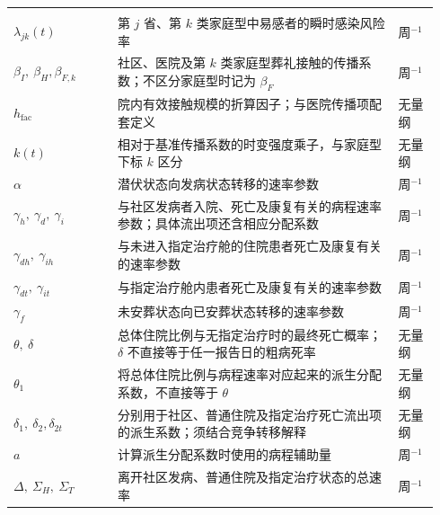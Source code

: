 \begin{longtable}{@{}>{\raggedright\arraybackslash}p{0.23\linewidth}>{\raggedright\arraybackslash}p{0.62\linewidth}>{\raggedright\arraybackslash}p{0.09\linewidth}@{}}
\midrule
\multicolumn{3}{@{}l}{\textbf{传播与病程参数}}\\*
$\lambda_{jk}(t)$ & 第 $j$ 省、第 $k$ 类家庭型中易感者的瞬时感染风险率 & 周$^{-1}$ \\
$\beta_I,\ \beta_H,$\newline $\beta_{F,k}$ & 社区、医院及第 $k$ 类家庭型葬礼接触的传播系数；不区分家庭型时记为 $\beta_F$ & 周$^{-1}$ \\
$h_{\mathrm{fac}}$ & 院内有效接触规模的折算因子；与医院传播项配套定义 & 无量纲 \\
$k(t)$ & 相对于基准传播系数的时变强度乘子，与家庭型下标 $k$ 区分 & 无量纲 \\
$\alpha$ & 潜伏状态向发病状态转移的速率参数 & 周$^{-1}$ \\
$\gamma_h,\ \gamma_d,\ \gamma_i$ & 与社区发病者入院、死亡及康复有关的病程速率参数；具体流出项还含相应分配系数 & 周$^{-1}$ \\
$\gamma_{dh},\ \gamma_{ih}$ & 与未进入指定治疗舱的住院患者死亡及康复有关的速率参数 & 周$^{-1}$ \\
$\gamma_{dt},\ \gamma_{it}$ & 与指定治疗舱内患者死亡及康复有关的速率参数 & 周$^{-1}$ \\
$\gamma_f$ & 未安葬状态向已安葬状态转移的速率参数 & 周$^{-1}$ \\
$\theta,\ \delta$ & 总体住院比例与无指定治疗时的最终死亡概率；$\delta$ 不直接等于任一报告日的粗病死率 & 无量纲 \\
$\theta_1$ & 将总体住院比例与病程速率对应起来的派生分配系数，不直接等于 $\theta$ & 无量纲 \\
$\delta_1,\ \delta_2,$\newline $\delta_{2t}$ & 分别用于社区、普通住院及指定治疗死亡流出项的派生系数；须结合竞争转移解释 & 无量纲 \\
$a$ & 计算派生分配系数时使用的病程辅助量 & 周$^{-1}$ \\
$\Delta,\ \Sigma_H,\ \Sigma_T$ & 离开社区发病、普通住院及指定治疗状态的总速率 & 周$^{-1}$ \\


\end{longtable}

